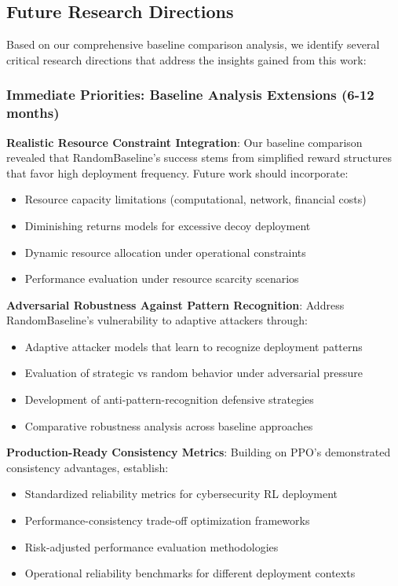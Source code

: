 \documentclass[12pt,oneside,a4paper]{article}
\theoremstyle{definition}
\theoremstyle{plain}
\begin{document}
\subsection{Future Research Directions}

Based on our comprehensive baseline comparison analysis, we identify several critical research directions that address the insights gained from this work:

\subsubsection{Immediate Priorities: Baseline Analysis Extensions (6-12 months)}

\textbf{Realistic Resource Constraint Integration}: Our baseline comparison revealed that RandomBaseline's success stems from simplified reward structures that favor high deployment frequency. Future work should incorporate:
\begin{itemize}
\item Resource capacity limitations (computational, network, financial costs)
\item Diminishing returns models for excessive decoy deployment
\item Dynamic resource allocation under operational constraints
\item Performance evaluation under resource scarcity scenarios
\end{itemize}

\textbf{Adversarial Robustness Against Pattern Recognition}: Address RandomBaseline's vulnerability to adaptive attackers through:
\begin{itemize}
\item Adaptive attacker models that learn to recognize deployment patterns
\item Evaluation of strategic vs random behavior under adversarial pressure
\item Development of anti-pattern-recognition defensive strategies
\item Comparative robustness analysis across baseline approaches
\end{itemize}

\textbf{Production-Ready Consistency Metrics}: Building on PPO's demonstrated consistency advantages, establish:
\begin{itemize}
\item Standardized reliability metrics for cybersecurity RL deployment
\item Performance-consistency trade-off optimization frameworks
\item Risk-adjusted performance evaluation methodologies
\item Operational reliability benchmarks for different deployment contexts
\end{itemize}
\end{document}
